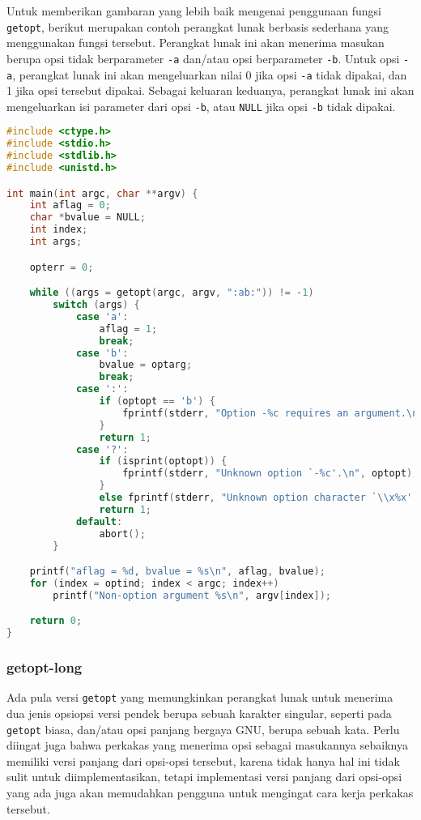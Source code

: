 \noindent
Untuk memberikan gambaran yang lebih baik mengenai penggunaan fungsi \verb|getopt|, berikut merupakan contoh perangkat lunak berbasis \cl sederhana yang menggunakan fungsi tersebut. Perangkat lunak ini akan menerima masukan berupa opsi tidak berparameter \verb|-a| dan/atau opsi berparameter \verb|-b|. Untuk opsi \verb|-a|, perangkat lunak ini akan mengeluarkan nilai 0 jika opsi \verb|-a| tidak dipakai, dan 1 jika opsi tersebut dipakai. Sebagai keluaran keduanya, perangkat lunak ini akan mengeluarkan isi parameter dari opsi \verb|-b|, atau \verb|NULL| jika opsi \verb|-b| tidak dipakai.

\begin{lstlisting}[language=C, caption=Contoh sederhana penggunaan getopt, label=code:getopt-usage]
#include <ctype.h>
#include <stdio.h>
#include <stdlib.h>
#include <unistd.h>

int main(int argc, char **argv) {
    int aflag = 0;
    char *bvalue = NULL;
    int index;
    int args;

    opterr = 0;

    while ((args = getopt(argc, argv, ":ab:")) != -1)
        switch (args) {
	        case 'a':
	            aflag = 1;
	            break;
	        case 'b':
	            bvalue = optarg;
	            break;
	        case ':':
    	        if (optopt == 'b') {
	                fprintf(stderr, "Option -%c requires an argument.\n", optopt);
	            }
	            return 1;
	        case '?':
	            if (isprint(optopt)) {
	                fprintf(stderr, "Unknown option `-%c'.\n", optopt);
	            }
	            else fprintf(stderr, "Unknown option character `\\x%x'.\n", optopt);
	            return 1;
	        default:
	            abort();
        }

    printf("aflag = %d, bvalue = %s\n", aflag, bvalue);
    for (index = optind; index < argc; index++)
        printf("Non-option argument %s\n", argv[index]);

    return 0;
}
\end{lstlisting}

\subsubsection{getopt-long}
\label{sec:cmodules-getopt-long}

Ada pula versi \verb|getopt| yang memungkinkan perangkat lunak untuk menerima dua jenis opsi\textemdash opsi versi pendek berupa sebuah karakter singular, seperti pada \verb|getopt| biasa, dan/atau opsi panjang bergaya GNU, berupa sebuah kata. Perlu diingat juga bahwa perkakas yang menerima opsi sebagai masukannya sebaiknya memiliki versi panjang dari opsi-opsi tersebut, karena tidak hanya hal ini tidak sulit untuk diimplementasikan, tetapi implementasi versi panjang dari opsi-opsi yang ada juga akan memudahkan pengguna untuk mengingat cara kerja perkakas tersebut.

